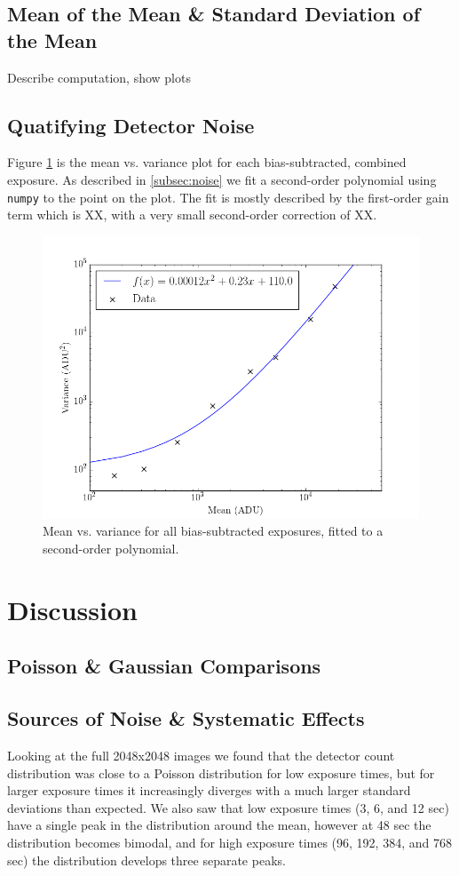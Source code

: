 \documentclass[preprint]{aastex62}
\begin{document}
\subsection{Mean of the Mean \& Standard Deviation of the Mean}
Describe computation, show plots

\subsection{Quatifying Detector Noise}
Figure \ref{fig:mean_var} is the mean vs. variance plot for each bias-subtracted, combined exposure. As described in \ref{subsec:noise} we fit a second-order polynomial using {\tt numpy} to the point on the plot. The fit is mostly described by the first-order gain term which is XX, with a very small second-order correction of XX.

\begin{figure}[H]
\begin{center}
\includegraphics[width=.48\linewidth]{plots/mean_vs_variance.png}
\caption{Mean vs. variance for all bias-subtracted exposures, fitted to a second-order polynomial.} \label{fig:mean_var}
\end{center}
\end{figure}

\section{Discussion}
\subsection{Poisson \& Gaussian Comparisons} \label{subsec:dist_comparisons}


\subsection{Sources of Noise \& Systematic Effects}
Looking at the full 2048x2048 images we found that the detector count distribution was close to a Poisson distribution for low exposure times, but for larger exposure times it increasingly diverges with a much larger standard deviations than expected. We also saw that low exposure times (3, 6, and 12 sec) have a single peak in the distribution around the mean, however at 48 sec the distribution becomes bimodal, and for high exposure times (96, 192, 384, and 768 sec) the distribution develops three separate peaks. 
\end{document}
